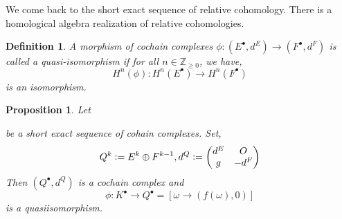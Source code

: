 \documentclass[8pt]{article}
\newtheorem{proposition}{Proposition}[section]
\newtheorem{definition}{Definition}[section]
\newcommand{\defeq}{\vcentcolon=}
\newcommand{\Z}[0]{\mathbb{Z}}
\begin{document}
We come back to the short exact sequence of relative cohomology. There is a homological algebra realization of relative cohomologies.
\begin{definition}
  A morphism of cochain complexes $\phi:(E^\bullet,d^E)\to(F^\bullet,d^F)$ is called a quasi-isomorphism if for all $n\in\Z_{\geq0}$, we have,
  \begin{equation*}
    H^n(\phi):H^n(E^\bullet)\to H^n(F^\bullet)
  \end{equation*}
  is an isomorphism.
\end{definition}
\begin{proposition}
  Let 
  \begin{center}
  \end{center}
  be a short exact sequence of cohain complexes. Set,
  \begin{equation*}
    Q^k \defeq E^k\oplus F^{k-1}, d^Q\defeq  \begin{pmatrix}
      d^E & O\\
      g & -d^F
    \end{pmatrix}
  \end{equation*}
  Then $(Q^\bullet,d^Q)$ is a cochain complex and 
  \begin{equation*}
    \phi:K^\bullet\to Q^\bullet = [\omega\to(f(\omega),0)]
  \end{equation*}
  is a quasiisomorphism.
  \label{proposition_extension_cochain_complexes}
\end{proposition}
\end{document}
